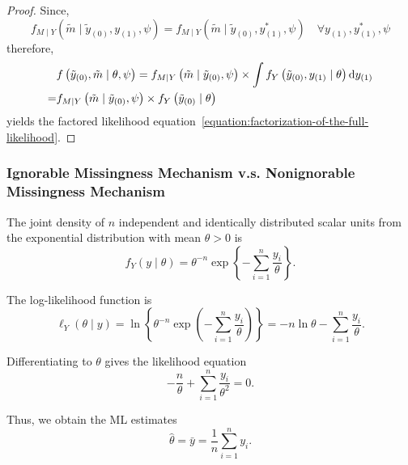 \begin{proof}
	Since,
	\begin{equation}
		f_{M \mid Y}\left(\tilde{m} \mid \tilde{y}_{(0)}, y_{(1)}, \psi\right)=f_{M \mid Y}\left(\tilde{m} \mid \tilde{y}_{(0)}, y_{(1)}^{*}, \psi\right) \quad \forall y_{(1)}, y_{(1)}^{*}, \psi
	\end{equation}
	therefore,
	\begin{equation}
		\begin{aligned}
			  & f\left(\tilde{y}_{(0)}, \tilde{m} \mid \theta, \psi\right)=f_{M \mid Y}\left(\tilde{m} \mid \tilde{y}_{(0)}, \psi\right) \times \int f_{Y}\left(\tilde{y}_{(0)}, y_{(1)} \mid \theta\right) \mathop{}\!\mathrm{d} y_{(1)} \\
			= & f_{M \mid Y}\left(\tilde{m} \mid \tilde{y}_{(0)}, \psi\right) \times f_{Y}\left(\tilde{y}_{(0)} \mid \theta\right)
		\end{aligned}
	\end{equation}
	yields the factored likelihood equation~\ref{equation:factorization-of-the-full-likelihood}.
\end{proof}

\subsubsection{Ignorable Missingness Mechanism v.s. Nonignorable Missingness Mechanism}

\begin{example}
	The joint density of \(n\) independent and identically distributed scalar units from the exponential distribution with mean \(\theta>0\) is
	\begin{equation}
		f_{Y}(y\mid\theta)=\theta^{-n}\exp\left\{-\sum_{i=1}^{n}\frac{y_{i}}{\theta}\right\}.
	\end{equation}

	The log-likelihood function is
	\begin{equation}
		\ell_{Y}(\theta\mid y)=\ln\left\{\theta^{-n}\exp\left(-\sum_{i=1}^{n}\frac{y_{i}}{\theta}\right)\right\}=-n\ln\theta-\sum_{i=1}^{n}\frac{y_{i}}{\theta}.
	\end{equation}

	Differentiating to \(\theta\) gives the likelihood equation
	\begin{equation}
		-\frac{n}{\theta}+\sum_{i=1}^{n} \frac{y_{i}}{\theta^{2}}=0.
	\end{equation}

	Thus, we obtain the ML estimates
	\begin{equation}
		\hat{\theta}=\bar{y}=\frac{1}{n}\sum_{i=1}^{n}y_i.
	\end{equation}
\end{example}

